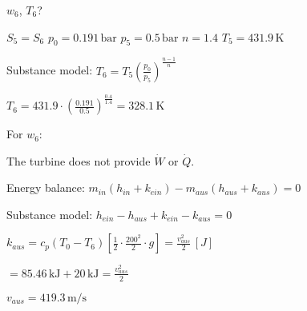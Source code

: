 \( w_6 \), \( T_6 \)?  

\( S_5 = S_6 \)  
\( p_0 = 0.191 \, \text{bar} \)  
\( p_5 = 0.5 \, \text{bar} \)  
\( n = 1.4 \)  
\( T_5 = 431.9 \, \text{K} \)  

Substance model:  
\( T_6 = T_5 \left( \frac{p_0}{p_5} \right)^{\frac{n-1}{n}} \)  

\( T_6 = 431.9 \cdot \left( \frac{0.191}{0.5} \right)^{\frac{0.4}{1.4}} = 328.1 \, \text{K} \)  

For \( w_6 \):  

The turbine does not provide \( \dot{W} \) or \( \dot{Q} \).  

Energy balance:  
\( m_{in} (h_{in} + k_{ein}) - m_{aus} (h_{aus} + k_{aus}) = 0 \)  

Substance model:  
\( h_{ein} - h_{aus} + k_{ein} - k_{aus} = 0 \)  

\( k_{aus} = c_p (T_0 - T_6) \left[ \frac{1}{2} \cdot \frac{200^2}{2} \cdot g \right] = \frac{v_{aus}^2}{2} \, [J] \)  

\( = 85.46 \, \text{kJ} + 20 \, \text{kJ} = \frac{v_{aus}^2}{2} \)  

\( v_{aus} = 419.3 \, \text{m/s} \)
